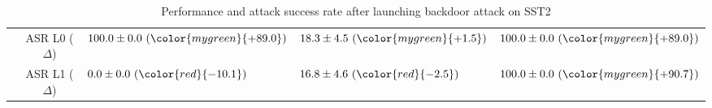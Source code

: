 \begin{table*}[!ht]
{\begin{tabular}{c | c | lll }
	& ASR L0 ($\Delta$)
	& $100.0 \pm 0.0 \ ({\color{mygreen}{+89.0}})$     %
	& $18.3 \pm 4.5  \ ({\color{mygreen}{+1.5}})$    %
	& $100.0 \pm 0.0  \ ({\color{mygreen}{+89.0}})$ \\ %
	
	& ASR L1 ($\Delta$)
	& $0.0 \pm 0.0 \ ({\color{red}{-10.1}})$     %
	& $16.8 \pm 4.6  \ ({\color{red}{-2.5}})$    %
	& $100.0 \pm 0.0  \ ({\color{mygreen}{+90.7}})$ \\ %
	
        \bottomrule
        \end{tabular}
 }
 \caption{Performance and attack success rate after launching backdoor attack on SST2}
 \label{tab:backdoor_perform_sst2}
\end{table*}

